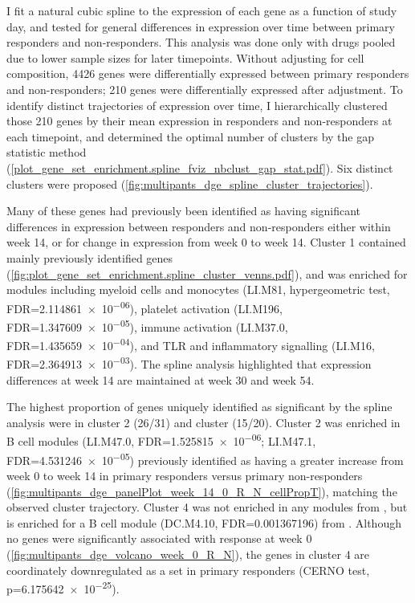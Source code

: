 \begin{outline}
I fit a natural cubic spline to the expression of each gene as a function of study day, and tested for general differences in expression over time between primary responders and non-responders.
This analysis was done only with drugs pooled due to lower sample sizes for later timepoints.
Without adjusting for cell composition, 
4426 genes were differentially expressed between primary responders and non-responders;
210 genes were differentially expressed after adjustment.
To identify distinct trajectories of expression over time, I hierarchically clustered those 210 genes by
their mean expression in responders and non-responders at each timepoint, 
and determined the optimal number of clusters by the gap statistic method (\autoref{plot_gene_set_enrichment.spline_fviz_nbclust_gap_stat.pdf}).
Six distinct clusters were proposed (\autoref{fig:multipants_dge_spline_cluster_trajectories}).

Many of these genes had previously been identified as having significant differences in expression between responders and non-responders
either within week 14, or for change in expression from week 0 to week 14.
Cluster 1 contained mainly previously identified genes (\autoref{fig:plot_gene_set_enrichment.spline_cluster_venns.pdf}),
and was enriched for modules including 
myeloid cells and monocytes (LI.M81, hypergeometric test, FDR=\num{2.114861e-06}),
platelet activation (LI.M196, FDR=\num{1.347609e-05}),
immune activation (LI.M37.0, FDR=\num{1.435659e-04}),
and TLR and inflammatory signalling (LI.M16, FDR=\num{2.364913e-03}).
The spline analysis highlighted that expression differences at week 14 are maintained at week 30 and week 54.

The highest proportion of genes uniquely identified as significant by the spline analysis were in cluster 2 (26/31) and cluster (15/20).
Cluster 2 was enriched in \autocite{li2013MolecularSignaturesAntibody} B cell modules (LI.M47.0, FDR=\num{1.525815e-06}; LI.M47.1, FDR=\num{4.531246e-05})
previously identified as having a greater increase from week 0 to week 14 in primary responders versus primary non-responders (\autoref{fig:multipants_dge_panelPlot_week_14_0_R_N_cellPropT}),
matching the observed cluster trajectory.
Cluster 4 was not enriched in any modules from \textcite{li2013MolecularSignaturesAntibody}, but is enriched for a B cell module (DC.M4.10, FDR=\num{0.001367196}) from \textcite{chaussabel2008ModularAnalysisFramework}.
Although no genes were significantly associated with response at week 0 (\autoref{fig:multipants_dge_volcano_week_0_R_N}),
the genes in cluster 4 are coordinately downregulated as a set in primary responders (CERNO test, p=\num{6.175642e-25}).


\end{outline}
